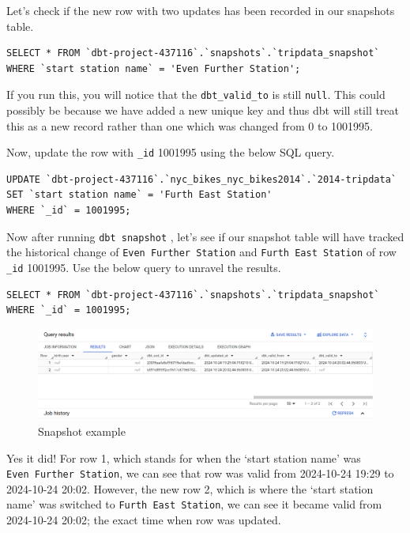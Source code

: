 \documentclass[
]{book}
\begin{document}
Let's check if the new row with two updates has been recorded in our snapshots table.

\begin{verbatim}
SELECT * FROM `dbt-project-437116`.`snapshots`.`tripdata_snapshot`
WHERE `start station name` = 'Even Further Station';
\end{verbatim}

If you run this, you will notice that the \texttt{dbt\_valid\_to} is still \texttt{null}. This could possibly be because we have added a new unique key and thus dbt will still treat this as a new record rather than one which was changed from 0 to 1001995.

Now, update the row with \texttt{\_id} 1001995 using the below SQL query.

\begin{verbatim}
UPDATE `dbt-project-437116`.`nyc_bikes_nyc_bikes2014`.`2014-tripdata`
SET `start station name` = 'Furth East Station'
WHERE `_id` = 1001995;
\end{verbatim}

Now after running \texttt{dbt\ snapshot} , let's see if our snapshot table will have tracked the historical change of \texttt{Even\ Further\ Station} and \texttt{Furth\ East\ Station} of row \texttt{\_id} 1001995. Use the below query to unravel the results.

\begin{verbatim}
SELECT * FROM `dbt-project-437116`.`snapshots`.`tripdata_snapshot`
WHERE `_id` = 1001995;
\end{verbatim}

\begin{figure}
\centering
\includegraphics{./images/snapshot_example.png}
\caption{Snapshot example}
\end{figure}

Yes it did! For row 1, which stands for when the `start station name' was \texttt{Even\ Further\ Station}, we can see that row was valid from 2024-10-24 19:29 to 2024-10-24 20:02. However, the new row 2, which is where the `start station name' was switched to \texttt{Furth\ East\ Station}, we can see it became valid from 2024-10-24 20:02; the exact time when row was updated.
\end{document}
